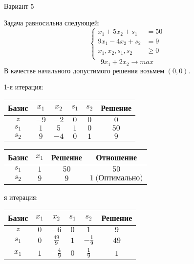 \documentclass{article}%
\begin{document}
\newpage%
\begin{center}%
\begin{Huge}%
Вариант 5%
\end{Huge}%
\end{center}%
Задача равносильна следующей: %
\[%
\left\{\begin{aligned}x_{1}+5x_{2}+s_{1} & =50 \\9x_{1}-4x_{2}+s_{2} & =9 \\x_{1},x_{2},s_{1},s_{2} & \ge 0 \\ \end{aligned}\right.%
\]%
\[%
9x_{1}+2x_{2}  \to max%
\]%
В качестве начального допустимого решения возьмем %
$(0, 0).$%
\begin{flushleft}%
1{-}я итерация: %
\newline%
\newline%
\renewcommand{\arraystretch}{1.3}%
\begin{tabular}{|c|cccc|c|}%
\hline%
Базис&$x_{1}$&$x_{2}$&$s_{1}$&$s_{2}$&Решение\\%
\hline%
$z$&$-9$&$-2$&$0$&$0$&$0$\\%
\hline%
$s_{1}$&$1$&$5$&$1$&$0$&$50$\\%
$s_{2}$&$9$&$-4$&$0$&$1$&$9$\\%
\hline%
\end{tabular}%
\newline%
\newline%
\newline%
\begin{tabular}{|cccc|}%
\hline%
Базис&$x_{1}$&Решение&Отношение\\%
\hline%
$s_{1}$&$1$&$50$&$50$\\%
$s_{2}$&$9$&$9$&$1\: \text{(Оптимально)}$\\%
\hline%
\end{tabular}%
\newline%
\newline%
я итерация: %
\newline%
\newline%
\renewcommand{\arraystretch}{1.3}%
\begin{tabular}{|c|cccc|c|}%
\hline%
Базис&$x_{1}$&$x_{2}$&$s_{1}$&$s_{2}$&Решение\\%
\hline%
$z$&$0$&$-6$&$0$&$1$&$9$\\%
\hline%
$s_{1}$&$0$&$\frac{49}{9}$&$1$&$-\frac{1}{9}$&$49$\\%
$x_{1}$&$1$&$-\frac{4}{9}$&$0$&$\frac{1}{9}$&$1$\\%

\end{tabular}
\end{flushleft}
\end{document}
